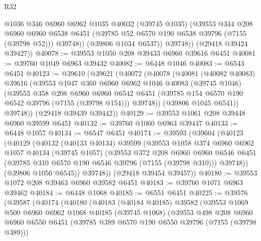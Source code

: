 \begin{lexlean}{R32}
\begin{coremodule}
              @1036
              @346
              @6960
              @6962
              @1035
              @40032
              (@39745 @1035)
              (@39553
                @344
                @208
                @6960
                @6960
                @6538
                @6451
                (@39785 @52 @6570 @190 @6538 @39796 (@7155 (@39798 @52)))
                @39748))
            (@39806 @1034 @6537))
          @39748))
      (@29418 @39424 @39427))
@40078 := @39553 @1050 @208 @39433 @6960 @39616 @6451
@40081 := @39760 @1049 @6963 @39432
@40082 := @6448 @1046
@40083 := @6543 @6451
@40123 := @39610
    (@39621
      (@40072
        (@40078
          (@40081
            (@40082 @40083)
            @39616
            (@39553
              @1047
              @360
              @6960
              @6962
              @1046
              @40083
              (@39745 @1046)
              (@39553
                @358
                @208
                @6960
                @6960
                @6542
                @6451
                (@39785 @154 @6570 @190 @6542 @39796 (@7155 (@39798 @154)))
                @39748))
            (@39806 @1045 @6541))
          @39748))
      (@29418 @39439 @39442))
@40129 := @39553 @1061 @208 @39448 @6960 @39599 @6451
@40132 := @39760 @1060 @6963 @39447
@40133 := @6448 @1057
@40134 := @6547 @6451
@40174 := @39593
    (@39604
      (@40123
        (@40129
          (@40132
            (@40133 @40134)
            @39599
            (@39553
              @1058
              @374
              @6960
              @6962
              @1057
              @40134
              (@39745 @1057)
              (@39553
                @372
                @208
                @6960
                @6960
                @6546
                @6451
                (@39785 @310 @6570 @190 @6546 @39796 (@7155 (@39798 @310)))
                @39748))
            (@39806 @1056 @6545))
          @39748))
      (@29418 @39454 @39457))
@40180 := @39553 @1072 @208 @39463 @6960 @39582 @6451
@40183 := @39760 @1071 @6963 @39462
@40184 := @6448 @1068
@40185 := @6551 @6451
@40225 := @39576
    (@39587
      (@40174
        (@40180
          (@40183
            (@40184 @40185)
            @39582
            (@39553
              @1069
              @500
              @6960
              @6962
              @1068
              @40185
              (@39745 @1068)
              (@39553
                @498
                @208
                @6960
                @6960
                @6550
                @6451
                (@39785 @389 @6570 @190 @6550 @39796 (@7155 (@39798 @389)))

\end{coremodule}
\end{lexlean}

